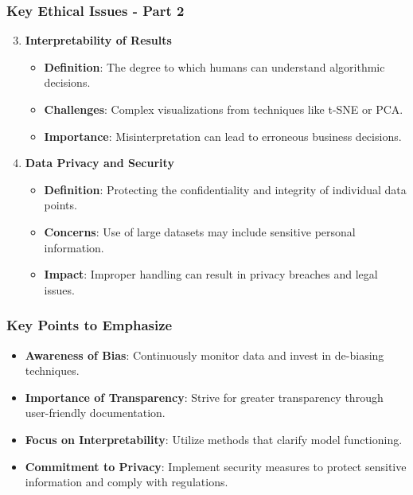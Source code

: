 \documentclass[aspectratio=169]{beamer}
\begin{document}
\begin{frame}[fragile]
    \frametitle{Key Ethical Issues - Part 2}
    \begin{enumerate}
        \setcounter{enumi}{2}
        \item \textbf{Interpretability of Results}
        \begin{itemize}
            \item \textbf{Definition}: The degree to which humans can understand algorithmic decisions.
            \item \textbf{Challenges}: Complex visualizations from techniques like t-SNE or PCA.
            \item \textbf{Importance}: Misinterpretation can lead to erroneous business decisions.
        \end{itemize}
        
        \item \textbf{Data Privacy and Security}
        \begin{itemize}
            \item \textbf{Definition}: Protecting the confidentiality and integrity of individual data points.
            \item \textbf{Concerns}: Use of large datasets may include sensitive personal information.
            \item \textbf{Impact}: Improper handling can result in privacy breaches and legal issues.
        \end{itemize}
    \end{enumerate}
\end{frame}

\begin{frame}[fragile]
    \frametitle{Key Points to Emphasize}
    \begin{itemize}
        \item \textbf{Awareness of Bias}: Continuously monitor data and invest in de-biasing techniques.
        \item \textbf{Importance of Transparency}: Strive for greater transparency through user-friendly documentation.
        \item \textbf{Focus on Interpretability}: Utilize methods that clarify model functioning.
        \item \textbf{Commitment to Privacy}: Implement security measures to protect sensitive information and comply with regulations.
    \end{itemize}
\end{frame}
\end{document}
